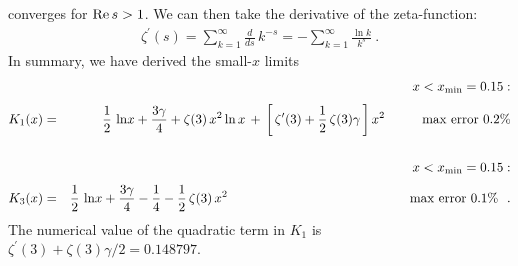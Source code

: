 \documentclass[preprint,12pt,eqsecnum,nofootinbib,amsmath,amssymb]{revtex4}
\begin{document}
converges for ${\rm Re}\, s > 1$. We can then take the 
derivative of the zeta-function:
\begin{eqnarray}
  \zeta^\prime(s) = \sum_{k=1}^\infty \frac{d}{ds}\,
  k^{-s}
  = - \sum_{k=1}^\infty \frac{\ln k}{k^s} \ .
\end{eqnarray}
In summary, we have derived the small-$x$ limits
\begin{eqnarray}
\nonumber
  && \hskip-1.5cm x < x_{\rm min}=0.15 :
\\[3pt]
  K_1(x) &=& \frac{1}{2}\,\ln\!x + \frac{3\gamma}{4} +
  \zeta(3)\, x^2 \ln x \,+\, 
  \bigg[\, \zeta^\prime(3) + \frac{1}{2} \,\zeta(3)
  \gamma \, \bigg]\, x^2
 \hskip1cm {\rm max~error}~ 0.2\%
\\[15pt]
\nonumber
  && \hskip-1.5cm x < x_{\rm min}=0.15 :
\\[3pt]
  K_3(x) &=& 
  \frac{1}{2}\,\ln\!x + \frac{3\gamma}{4} - 
  \frac{1}{4} - \frac{1}{2}\,\zeta(3)\, x^2 
 \hskip4.9cm {\rm max~error}~ 0.1\% ~~ .
\end{eqnarray}
The numerical value of the quadratic term in $K_1$
is $\zeta^\prime(3) + \zeta(3)\gamma/2=0.148797$.
\end{document}

